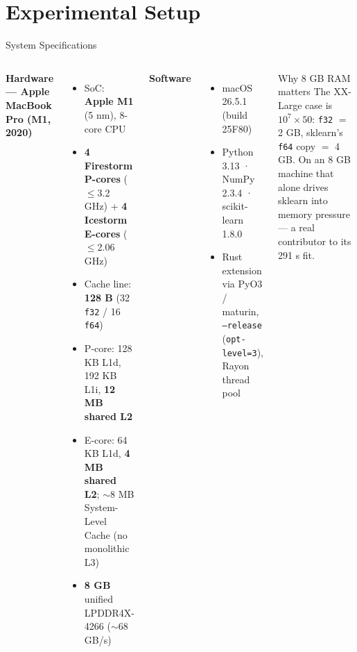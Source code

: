 \documentclass[aspectratio=169]{beamer}
\begin{document}
\section{Experimental Setup}

\begin{frame}{System Specifications}
  \begin{columns}[T]
    \textbf{Hardware — Apple MacBook Pro (M1, 2020)}
    \begin{itemize}
      \item SoC: \textbf{Apple M1} (5 nm), 8-core CPU
      \item \textbf{4 Firestorm P-cores} ($\leq$3.2 GHz) +
            \textbf{4 Icestorm E-cores} ($\leq$2.06 GHz)
      \item Cache line: \textbf{128 B} (32 \texttt{f32} / 16 \texttt{f64})
      \item P-core: 128 KB L1d, 192 KB L1i, \textbf{12 MB shared L2}
      \item E-core: 64 KB L1d, \textbf{4 MB shared L2}; $\sim$8 MB System-Level
            Cache (no monolithic L3)
      \item \textbf{8 GB} unified LPDDR4X-4266 ($\sim$68 GB/s)
    \end{itemize}
    \textbf{Software}
    \begin{itemize}
      \item macOS 26.5.1 (build 25F80)
      \item Python 3.13 · NumPy 2.3.4 · scikit-learn 1.8.0
      \item Rust extension via PyO3 / maturin, \texttt{--release}
            (\texttt{opt-level=3}), Rayon thread pool
    \end{itemize}
    \vspace{0.3em}
    \begin{alertblock}{Why 8 GB RAM matters}
      The XX-Large case is $10^7\times50$: \texttt{f32} $=$ 2 GB, sklearn's
      \texttt{f64} copy $=$ 4 GB. On an 8 GB machine that alone drives sklearn
      into memory pressure — a real contributor to its 291 s fit.
    \end{alertblock}
  \end{columns}
\end{frame}
\end{document}
